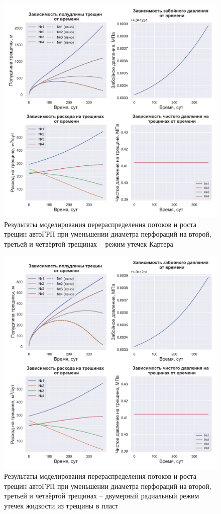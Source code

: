 \begin{figure}[H] 
\center
\includegraphics[width=0.9\linewidth]{images/myimage9.jpg}
\caption{Результаты моделирования перераспределения потоков и роста трещин автоГРП при уменьшении диаметра перфораций на второй, третьей и четвёртой трещинах -- режим утечек Картера}
\label{fig:myimage9}
\end{figure}


\begin{figure}[H] 
\center
\includegraphics[width=\linewidth]{images/myimage10.jpg}
\caption{Результаты моделирования перераспределения потоков и роста трещин автоГРП при уменьшении диаметра перфораций на второй, третьей и четвёртой трещинах -- двумерный радиальный режим утечек жидкости из трещины в пласт}
\label{fig:myimage10}
\end{figure}

